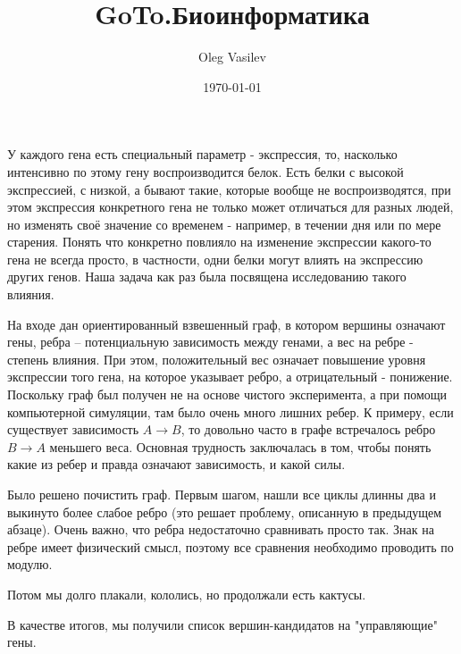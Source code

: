 \documentclass[a4paper, 14pt]{article}
\title{GoTo.Биоинформатика}
\date{\today}
\author{Oleg Vasilev}
\theoremstyle{definition}
\theoremstyle{plain}
\theoremstyle{remark}
\begin{document}
\maketitle
У каждого гена есть специальный параметр - экспрессия, то, насколько интенсивно по этому гену воспроизводится белок. Есть белки с высокой экспрессией, с низкой, а бывают такие, которые вообще не воспроизводятся, при этом экспрессия конкретного гена не только может отличаться для разных людей, но изменять своё значение со временем - например, в течении дня или по мере старения. Понять что конкретно повлияло на изменение экспрессии какого-то гена не всегда просто, в частности, одни белки могут влиять на экспрессию других генов. Наша задача как раз была посвящена исследованию такого влияния. 

На входе дан ориентированный взвешенный граф, в котором вершины означают гены, ребра -- потенциальную зависимость между генами, а вес на ребре - степень влияния. При этом, положительный вес означает повышение уровня экспрессии того гена, на которое указывает ребро, а отрицательный - понижение. Поскольку граф был получен не на основе чистого эксперимента, а при помощи компьютерной симуляции, там было очень много лишних ребер. К примеру, если существует зависимость $A \to B$, то довольно часто в графе встречалось ребро $B \to A$ меньшего веса. Основная трудность заключалась в том, чтобы понять какие из ребер и правда означают зависимость, и какой силы.

Было решено почистить граф. Первым шагом, нашли все циклы длинны два и выкинуто более слабое ребро (это решает проблему, описанную в предыдущем абзаце). Очень важно, что ребра недостаточно сравнивать просто так. Знак на ребре имеет физический смысл, поэтому все сравнения необходимо проводить по модулю.

Потом мы долго плакали, кололись, но продолжали есть кактусы.

В качестве итогов, мы получили список вершин-кандидатов на "управляющие" гены.
\end{document}

